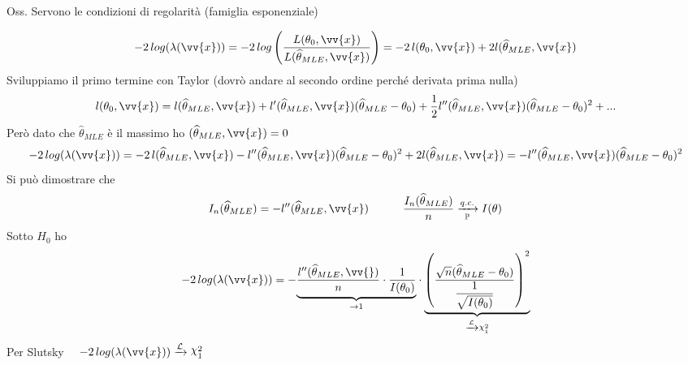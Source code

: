 Oss. Servono le condizioni di regolarità (famiglia esponenziale)\\ 

\begin{Dim}
    \[
    -2\, log(\lambda(\vv{x}))= - 2\, log\O\frac{L(\theta_0,\vv{x})}{L(\hat{\theta}_{MLE},\vv{x})}\C = -2\,l(\theta_0,\vv{x})+2l(\hat{\theta}_{MLE},\vv{x})
    \]
    Sviluppiamo il primo termine con Taylor (dovrò andare al secondo ordine perché derivata prima nulla)
    \[
    l(\theta_0,\vv{x})= l(\hat{\theta}_{MLE},\vv{x}) + l'(\hat{\theta}_{MLE},\vv{x})(\hat{\theta}_{MLE}-\theta_0) + \frac12 l''(\hat{\theta}_{MLE},\vv{x})(\hat{\theta}_{MLE}-\theta_0)^2 + ...
    \]
    Però dato che $\hat{\theta}_{MLE}$ è il massimo ho $(\hat{\theta}_{MLE},\vv{x})=0$
    \[
    -2\,log(\lambda(\vv{x}))= -2\, l(\hat{\theta}_{MLE},\vv{x})-l''(\hat{\theta}_{MLE},\vv{x})(\hat{\theta}_{MLE}-\theta_0)^2 + 2 l (\hat{\theta}_{MLE},\vv{x}) = -l''(\hat{\theta}_{MLE},\vv{x})(\hat{\theta}_{MLE}-\theta_0)^2
    \]
    Si può dimostrare che
    \[
    I_n(\hat{\theta}_{MLE})= -l''(\hat{\theta}_{MLE},\vv{x}) \hspace{30pt} \frac{I_n(\hat{\theta}_{MLE})}{n} \xrightarrow[\PP]{q.c.} I(\theta)
    \]
    Sotto $H_0$ ho
    \[
    -2\,log(\lambda(\vv{x}))=-\UB{\to1}{\frac{l''(\hat{\theta}_{MLE},\vv{})}{n}\cdot \frac{1}{I(\theta_0)}} \cdot \UB{\xrightarrow{\Lc}\Chi_1^2}{\O\frac{\sqrt{n}(\hat{\theta}_{MLE}-\theta_0)}{\frac{1}{\sqrt{I(\theta_0)}}}\C^2}
    \]
    Per Slutsky \ \ $-2\,log(\lambda(\vv{x})) \xrightarrow{\Lc} \Chi_1^2$\\
\end{Dim}


